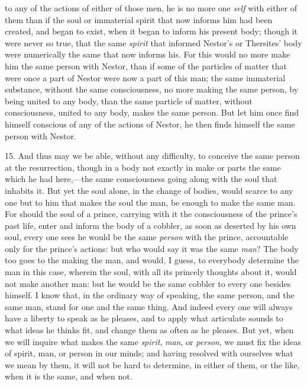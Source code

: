 to any of the actions of either of those men, he is no more one
\textit{self} with either of them than if the soul or immaterial
spirit that now informs him had been created, and began to exist, when
it began to inform his present body; though it were never so true,
that the same \textit{spirit} that informed Nestor's or Thersites'
body were numerically the same that now informs his. For this would no
more make him the same person with Nestor, than if some of the
particles of matter that were once a part of Nestor were now a part of
this man; the same immaterial substance, without the same
consciousness, no more making the same person, by being united to any
body, than the same particle of matter, without consciousness, united
to any body, makes the same person. But let him once find himself
conscious of any of the actions of Nestor, he then finds himself the
same person with Nestor.

15. And thus may we be able, without any difficulty, to conceive the
same person at the resurrection, though in a  body not
exactly in make or parts the same which he had here,---the same
consciousness going along with the soul that inhabits it. But yet the
soul alone, in the change of bodies, would scarce to any one but to
him that makes the soul the man, be enough to make the same man. For
should the soul of a prince, carrying with it the consciousness of the
prince's past life, enter and inform the body of a cobbler, as soon as
deserted by his own soul, every one sees he would be the same
\textit{person} with the prince, accountable only for the prince's
actions: but who would say it was the same \textit{man}? The body too
goes to the making the man, and would, I guess, to everybody determine
the man in this case, wherein the soul, with all its princely thoughts
about it, would not make another man: but he would be the same cobbler
to every one besides himself. I know that, in the ordinary way of
speaking, the same person, and the same man, stand for one and the
same thing. And indeed every one will always have a liberty to speak
as he pleases, and to apply what articulate sounds to what ideas he
thinks fit, and change them as often as he pleases. But yet, when we
will inquire what makes the same \textit{spirit}, \textit{man}, or
\textit{person}, we must fix the ideas of spirit, man, or person in
our minds; and having resolved with ourselves what we mean by them, it
will not be hard to determine, in either of them, or the like, when it
is the same, and when not.

